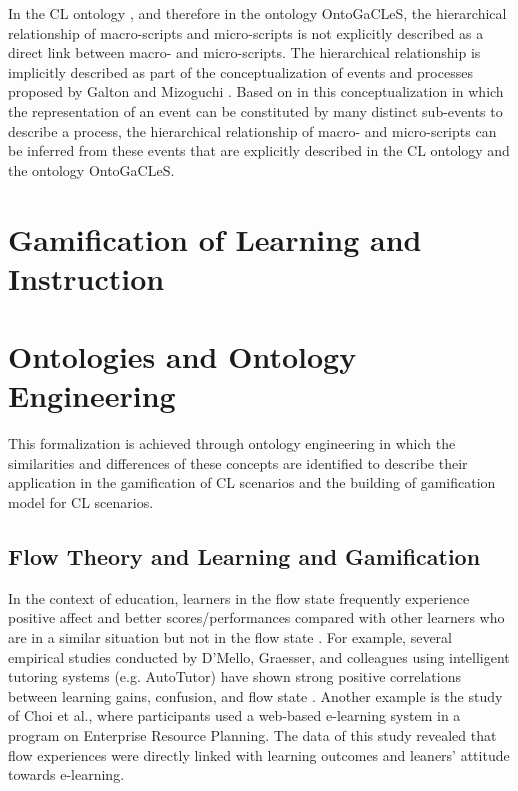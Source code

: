 In the CL ontology \cite{IsotaniInabaIkedaMizoguchi2009}, and therefore in the ontology OntoGaCLeS, the hierarchical relationship of macro-scripts and micro-scripts is not explicitly described as a direct link between macro- and micro-scripts. The hierarchical relationship is implicitly described as part of the conceptualization of events and processes proposed by Galton and Mizoguchi \cite{GaltonMizoguchi2009}. Based on in this conceptualization in which the representation of an event can be constituted by many distinct sub-events to describe a process, the hierarchical relationship of macro- and micro-scripts can be inferred from these events that are explicitly described in the CL ontology and the ontology OntoGaCLeS.


\section{Gamification of Learning and Instruction}
\label{sec:gamification}

\section{Ontologies and Ontology Engineering}
\label{sec:ontologies-and-ontology-engineering}

This formalization is achieved through ontology engineering in which the similarities and differences of these concepts are identified to describe their application in the gamification of CL scenarios and the building of gamification model for CL scenarios.




\subsection{Flow Theory and Learning and Gamification}


In the context of education, learners in the flow state frequently experience positive affect and better scores/performances compared with other learners who are in a similar situation but not in the flow state \cite{BaydasKarakusTopuYilmazOzturkGoktas2015, IbanezDiSerioVillaranDelgadoKloos2014, ShernoffCsikszentmihalyiSchneiderShernoff2014}. For example, several empirical studies conducted by D’Mello, Graesser, and colleagues using intelligent tutoring systems (e.g. AutoTutor) have shown strong positive correlations between learning gains, confusion, and flow state \cite{D'MelloGraesser2012}. Another example is the study of Choi et al., where participants used a web-based e-learning system in a program on Enterprise Resource Planning. The data of this study revealed that flow experiences were directly linked with learning outcomes and leaners’ attitude towards e-learning.

